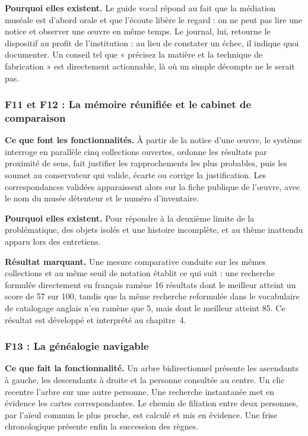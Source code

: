 \textbf{Pourquoi elles existent.} Le guide vocal répond au fait que la médiation
muséale est d'abord orale et que l'écoute libère le regard : on ne peut pas lire
une notice et observer une œuvre en même temps. Le journal, lui, retourne le
dispositif au profit de l'institution : au lieu de constater un échec, il
indique quoi documenter. Un conseil tel que « précisez la matière et la
technique de fabrication » est directement actionnable, là où un simple décompte
ne le serait pas.

\subsubsection{F11 et F12 : La mémoire réunifiée et le cabinet de comparaison}

\textbf{Ce que font les fonctionnalités.} À partir de la notice d'une œuvre, le
système interroge en parallèle cinq collections ouvertes, ordonne les résultats
par proximité de sens, fait justifier les rapprochements les plus probables,
puis les soumet au conservateur qui valide, écarte ou corrige la justification.
Les correspondances validées apparaissent alors sur la fiche publique de
l'œuvre, avec le nom du musée détenteur et le numéro d'inventaire.

\textbf{Pourquoi elles existent.} Pour répondre à la deuxième limite de la
problématique, des objets isolés et une histoire incomplète, et au thème
inattendu apparu lors des entretiens.

\textbf{Résultat marquant.} Une mesure comparative conduite sur les mêmes
collections et au même seuil de notation établit ce qui suit : une recherche
formulée directement en français ramène 16 résultats dont le meilleur atteint un
score de 57 sur 100, tandis que la même recherche reformulée dans le vocabulaire
de catalogage anglais n'en ramène que 5, mais dont le meilleur atteint 85. Ce
résultat est développé et interprété au chapitre~4.

\subsubsection{F13 : La généalogie navigable}

\textbf{Ce que fait la fonctionnalité.} Un arbre bidirectionnel présente les
ascendants à gauche, les descendants à droite et la personne consultée au
centre. Un clic recentre l'arbre sur une autre personne. Une recherche
instantanée met en évidence les cartes correspondantes. Le chemin de filiation
entre deux personnes, par l'aïeul commun le plus proche, est calculé et mis en
évidence. Une frise chronologique présente enfin la succession des règnes.


